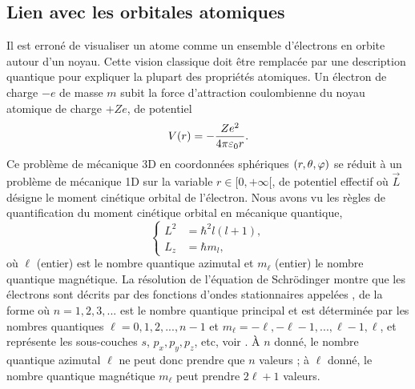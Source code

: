 \documentclass[12pt,fancy]{cours}
\begin{document}
\subsection{Lien avec les orbitales atomiques}
 Il est erroné de visualiser un atome comme un ensemble d’électrons en orbite autour d’un noyau. Cette vision classique doit être remplacée par une description quantique pour expliquer la plupart des propriétés atomiques. Un électron de charge $-e$ de masse $m$ subit la force d'attraction coulombienne du noyau atomique de charge $+Ze$, de potentiel 
 \begin{equation}
    V(r) = -\frac{Ze^2}{4\pi\varepsilon_0 r}.
 \end{equation}
Ce problème de mécanique 3D en coordonnées sphériques $(r,\theta,\varphi)$ se réduit à un problème de mécanique 1D sur la variable $r \in [0,+\infty[$, de potentiel effectif 
  où $\Vec{L}$ désigne le moment cinétique orbital de l'électron. Nous avons vu les règles de quantification du moment cinétique orbital en mécanique quantique,
  \begin{equation}
    \begin{cases}
      L^2 & = \hbar^2 l(l+1),\\ 
      L_z & = \hbar m_l,
    \end{cases}
  \end{equation}
    où $\ell$ (entier) est le nombre quantique azimutal et $m_\ell$ (entier) le nombre quantique magnétique. La résolution de l'équation de Schrödinger montre que les électrons sont décrits par des fonctions d’ondes stationnaires appelées , de la forme
où $n=1,2,3,...$ est le nombre quantique principal et  est déterminée par les nombres quantiques $\ell=0,1,2,...,n-1$ et $m_\ell=-\ell,-\ell-1,...,\ell-1,\ell$, et représente les sous-couches $s$, $p_x,p_y,p_z$, etc, voir . À $n$ donné, le nombre quantique azimutal $\ell$ ne peut donc prendre que $n$ valeurs ; à $\ell$ donné, le nombre quantique magnétique $m_\ell$ peut prendre $2\ell+1$ valeurs. 
\end{document}
